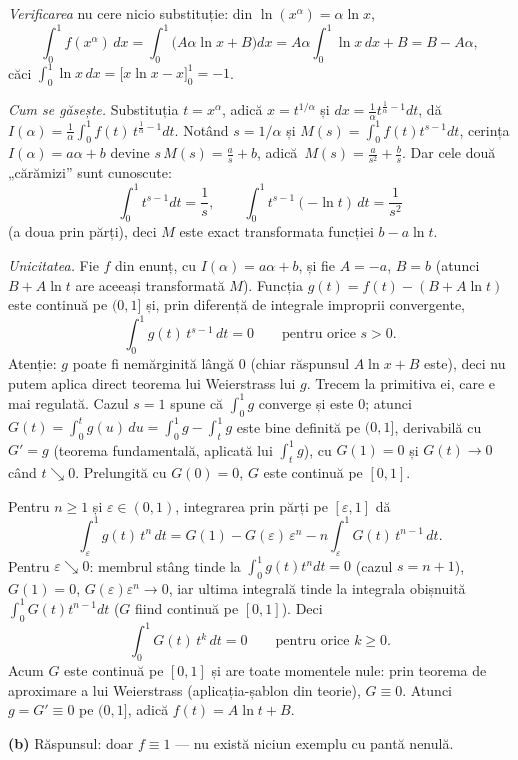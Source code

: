 \emph{Verificarea} nu cere nicio substituție: din $\ln(x^{\alpha})=\alpha\ln x$,
\[ \int_0^{1}f(x^{\alpha})\,dx=\int_0^{1}\bigl(A\alpha\ln x+B\bigr)dx
   =A\alpha\int_0^{1}\ln x\,dx+B=B-A\alpha, \]
căci $\int_0^{1}\ln x\,dx=\bigl[x\ln x-x\bigr]_0^{1}=-1$.

\emph{Cum se găsește.} Substituția $t=x^{\alpha}$, adică $x=t^{1/\alpha}$ și
$dx=\frac1\alpha t^{\frac1\alpha-1}dt$, dă
$I(\alpha)=\frac{1}{\alpha}\int_0^{1}f(t)\,t^{\frac1\alpha-1}dt$.
Notând $s=1/\alpha$ și $M(s)=\int_0^{1}f(t)t^{s-1}dt$, cerința $I(\alpha)=a\alpha+b$
devine $s\,M(s)=\frac as+b$, adică\
$M(s)=\frac{a}{s^2}+\frac bs$. Dar cele două
„cărămizi'' sunt cunoscute:
\[ \int_0^{1}t^{s-1}dt=\frac1s,\qquad \int_0^{1}t^{s-1}(-\ln t)\,dt=\frac{1}{s^2} \]
(a doua prin părți), deci $M$ este exact transformata funcției $b-a\ln t$.

\emph{Unicitatea.} Fie $f$ din enunț, cu $I(\alpha)=a\alpha+b$, și fie
$A=-a$, $B=b$ (atunci $B+A\ln t$ are aceeași transformată $M$). Funcția
$g(t)=f(t)-(B+A\ln t)$ este continuă pe $(0,1]$ și, prin diferență de integrale
improprii convergente,
\[ \int_0^{1}g(t)\,t^{s-1}\,dt=0\qquad\text{pentru orice }s>0 . \]
Atenție: $g$ poate fi nemărginită lângă $0$ (chiar răspunsul $A\ln x+B$ este), deci nu
putem aplica direct teorema lui Weierstrass lui $g$. Trecem la primitiva ei, care
e mai regulată. Cazul $s=1$ spune că $\int_0^1 g$ converge și este $0$; atunci
$G(t)=\int_0^{t}g(u)\,du=\int_0^1 g-\int_t^1 g$ este bine definită pe $(0,1]$,
derivabilă cu $G'=g$ (teorema fundamentală, aplicată lui $\int_t^1 g$), cu $G(1)=0$
și $G(t)\to0$ când $t\searrow0$. Prelungită cu $G(0)=0$, $G$ este continuă pe $[0,1]$.

Pentru $n\ge1$ și $\varepsilon\in(0,1)$, integrarea prin părți pe $[\varepsilon,1]$ dă
\[ \int_\varepsilon^{1}g(t)\,t^{n}\,dt=G(1)-G(\varepsilon)\,\varepsilon^{n}-n\int_\varepsilon^{1}G(t)\,t^{n-1}\,dt . \]
Pentru $\varepsilon\searrow0$: membrul stâng tinde la $\int_0^1 g(t)t^{n}dt=0$ (cazul
$s=n+1$), $G(1)=0$, $G(\varepsilon)\varepsilon^{n}\to0$, iar ultima integrală tinde
la integrala obișnuită $\int_0^1 G(t)t^{n-1}dt$ ($G$ fiind continuă pe $[0,1]$). Deci
\[ \int_0^{1}G(t)\,t^{k}\,dt=0\qquad\text{pentru orice }k\ge0 . \]
Acum $G$ este continuă pe $[0,1]$ și are toate momentele nule: prin teorema de
aproximare a lui Weierstrass (aplicația-șablon din teorie), $G\equiv0$. Atunci
$g=G'\equiv0$ pe $(0,1]$, adică $f(t)=A\ln t+B$.

\noindent\textbf{(b)} Răspunsul: doar $f\equiv1$ --- nu există niciun exemplu cu
pantă nenulă.

